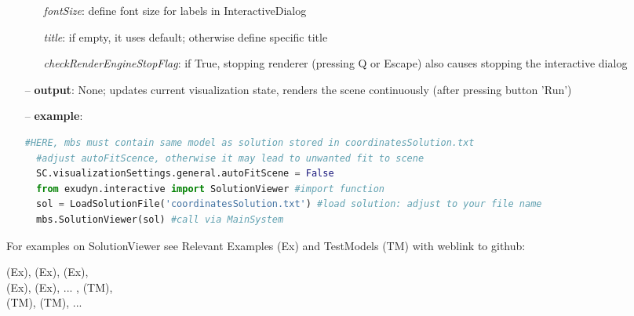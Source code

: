 \begin{itemize}[leftmargin=0.7cm]
\begin{itemize}[leftmargin=1.2cm]
\item[]{\it fontSize}: define font size for labels in InteractiveDialog
\item[]{\it title}: if empty, it uses default; otherwise define specific title
\item[]{\it checkRenderEngineStopFlag}: if True, stopping renderer (pressing Q or Escape) also causes stopping the interactive dialog
\end{itemize}
\item[--]
{\bf output}: None; updates current visualization state, renders the scene continuously (after pressing button 'Run')
\item[--]
{\bf example}: \vspace{-12pt}\ei\begin{lstlisting}[language=Python, xleftmargin=36pt]
  #HERE, mbs must contain same model as solution stored in coordinatesSolution.txt
  #adjust autoFitScence, otherwise it may lead to unwanted fit to scene
  SC.visualizationSettings.general.autoFitScene = False
  from exudyn.interactive import SolutionViewer #import function
  sol = LoadSolutionFile('coordinatesSolution.txt') #load solution: adjust to your file name
  mbs.SolutionViewer(sol) #call via MainSystem
\end{lstlisting}\vspace{-24pt}\bi\item[]\vspace{-24pt}\vspace{12pt}\end{itemize}
%

%
\noindent For examples on SolutionViewer see Relevant Examples (Ex) and TestModels (TM) with weblink to github:
\bi
 \item \footnotesize {} (Ex), 
 (Ex), 
 (Ex), 
\\  (Ex), 
 (Ex), 
 ...
, 
 (TM), 
\\  (TM), 
 (TM), 
 ...

